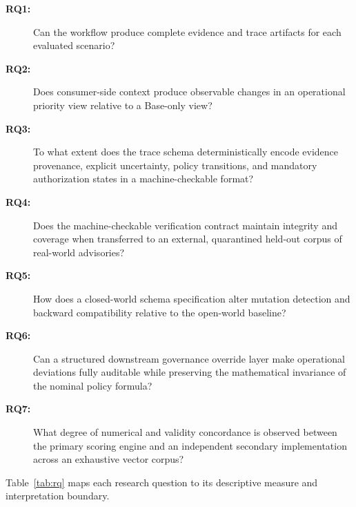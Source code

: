 \documentclass[conference]{IEEEtran}
\begin{document}
\begin{description}
\item[\textbf{RQ1:}] Can the workflow produce complete evidence and trace artifacts for each evaluated scenario?
\item[\textbf{RQ2:}] Does consumer-side context produce observable changes in an operational priority view relative to a Base-only view?
\item[\textbf{RQ3:}] To what extent does the trace schema deterministically encode evidence provenance, explicit uncertainty, policy transitions, and mandatory authorization states in a machine-checkable format?
\item[\textbf{RQ4:}] Does the machine-checkable verification contract maintain integrity and coverage when transferred to an external, quarantined held-out corpus of real-world advisories?
\item[\textbf{RQ5:}] How does a closed-world schema specification alter mutation detection and backward compatibility relative to the open-world baseline?
\item[\textbf{RQ6:}] Can a structured downstream governance override layer make operational deviations fully auditable while preserving the mathematical invariance of the nominal policy formula?
\item[\textbf{RQ7:}] What degree of numerical and validity concordance is observed between the primary scoring engine and an independent secondary implementation across an exhaustive vector corpus?
\end{description}

Table~\ref{tab:rq} maps each research question to its descriptive measure and
interpretation boundary.
\end{document}
